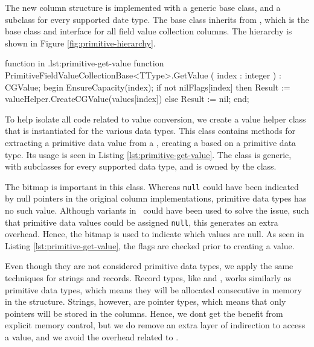 The new column structure is implemented with a generic base class, and a subclass for every supported date type. The base class inherits from , which is the base class and interface for all field value collection columns. The hierarchy is shown in Figure \ref{fig:primitive-hierarchy}.

\begin{delphicode}{ function in .}{lst:primitive-get-value}
function PrimitiveFieldValueCollectionBase<TType>.GetValue
( index : integer )
: CGValue;
begin
  EnsureCapacity(index);
  if not nilFlags[index] then
    Result := valueHelper.CreateCGValue(values[index])
  else
    Result := nil;
end;
\end{delphicode}

To help isolate all code related to value conversion, we create a value helper class that is instantiated for the various data types. This class contains methods for extracting a primitive data value from a , creating a  based on a primitive data type. Its usage is seen in Listing \ref{lst:primitive-get-value}. The class is generic, with subclasses for every supported data type, and is owned by the  class.

The  bitmap is important in this class. Whereas \texttt{null} could have been indicated by null pointers in the original column implementations, primitive data types has no such value. Although variants in \delphi~could have been used to solve the issue, such that primitive data values could be assigned \texttt{null}, this generates an extra overhead. Hence, the bitmap is used to indicate which values are null. As seen in Listing \ref{lst:primitive-get-value}, the flags are checked prior to creating a value.

Even though they are not considered primitive data types, we apply the same techniques for strings and records. Record types, like  and , works similarly as primitive data types, which means they will be allocated consecutive in memory in the  structure. Strings, however, are pointer types, which means that only pointers will be stored in the columns. Hence, we dont get the benefit from explicit memory control, but we do remove an extra layer of indirection to access a value, and we avoid the overhead related to .

